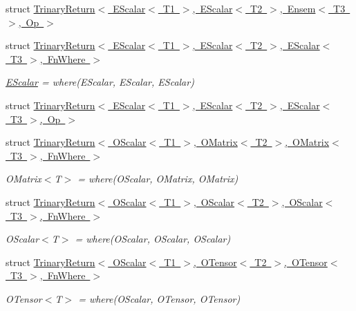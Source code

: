 \begin{DoxyCompactItemize}
struct \mbox{\hyperlink{structENSEM_1_1TrinaryReturn_3_01EScalar_3_01T1_01_4_00_01EScalar_3_01T2_01_4_00_01Ensem_3_01T3_01_4_00_01Op_01_4}{Trinary\+Return$<$ E\+Scalar$<$ T1 $>$, E\+Scalar$<$ T2 $>$, Ensem$<$ T3 $>$, Op $>$}}
\item 
struct \mbox{\hyperlink{structENSEM_1_1TrinaryReturn_3_01EScalar_3_01T1_01_4_00_01EScalar_3_01T2_01_4_00_01EScalar_3_01T3_01_4_00_01FnWhere_01_4}{Trinary\+Return$<$ E\+Scalar$<$ T1 $>$, E\+Scalar$<$ T2 $>$, E\+Scalar$<$ T3 $>$, Fn\+Where $>$}}
\begin{DoxyCompactList}\small\item\em \mbox{\hyperlink{classENSEM_1_1EScalar}{E\+Scalar}} = where(\+E\+Scalar, E\+Scalar, E\+Scalar) \end{DoxyCompactList}\item 
struct \mbox{\hyperlink{structENSEM_1_1TrinaryReturn_3_01EScalar_3_01T1_01_4_00_01EScalar_3_01T2_01_4_00_01EScalar_3_01T3_01_4_00_01Op_01_4}{Trinary\+Return$<$ E\+Scalar$<$ T1 $>$, E\+Scalar$<$ T2 $>$, E\+Scalar$<$ T3 $>$, Op $>$}}
\item 
struct \mbox{\hyperlink{structENSEM_1_1TrinaryReturn_3_01OScalar_3_01T1_01_4_00_01OMatrix_3_01T2_01_4_00_01OMatrix_3_01T3_01_4_00_01FnWhere_01_4}{Trinary\+Return$<$ O\+Scalar$<$ T1 $>$, O\+Matrix$<$ T2 $>$, O\+Matrix$<$ T3 $>$, Fn\+Where $>$}}
\begin{DoxyCompactList}\small\item\em O\+Matrix$<$\+T$>$ = where(\+O\+Scalar, O\+Matrix, O\+Matrix) \end{DoxyCompactList}\item 
struct \mbox{\hyperlink{structENSEM_1_1TrinaryReturn_3_01OScalar_3_01T1_01_4_00_01OScalar_3_01T2_01_4_00_01OScalar_3_01T3_01_4_00_01FnWhere_01_4}{Trinary\+Return$<$ O\+Scalar$<$ T1 $>$, O\+Scalar$<$ T2 $>$, O\+Scalar$<$ T3 $>$, Fn\+Where $>$}}
\begin{DoxyCompactList}\small\item\em O\+Scalar$<$\+T$>$ = where(\+O\+Scalar, O\+Scalar, O\+Scalar) \end{DoxyCompactList}\item 
struct \mbox{\hyperlink{structENSEM_1_1TrinaryReturn_3_01OScalar_3_01T1_01_4_00_01OTensor_3_01T2_01_4_00_01OTensor_3_01T3_01_4_00_01FnWhere_01_4}{Trinary\+Return$<$ O\+Scalar$<$ T1 $>$, O\+Tensor$<$ T2 $>$, O\+Tensor$<$ T3 $>$, Fn\+Where $>$}}
\begin{DoxyCompactList}\small\item\em O\+Tensor$<$\+T$>$ = where(\+O\+Scalar, O\+Tensor, O\+Tensor) \end{DoxyCompactList}\item 

\end{DoxyCompactItemize}
